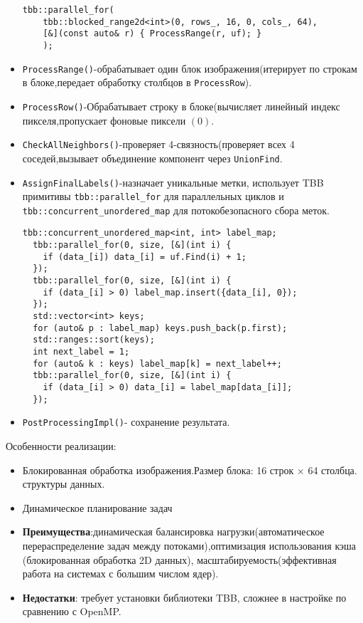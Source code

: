 \documentclass[12pt]{extarticle}
\begin{document}
\begin{itemize}
    \begin{lstlisting}[caption={Разделение изображения на блоки методе ProcessComponents},label={all5}]
    tbb::parallel_for(
    tbb::blocked_range2d<int>(0, rows_, 16, 0, cols_, 64),
    [&](const auto& r) { ProcessRange(r, uf); }
    );
    \end{lstlisting}
    \item \texttt{ProcessRange()}-обрабатывает один блок изображения(итерирует по строкам в блоке,передает обработку столбцов в \texttt{ProcessRow}).
    \item \texttt{ProcessRow()}-Обрабатывает строку в блоке(вычисляет линейный индекс пикселя,пропускает фоновые пиксели $(0)$.
    \item \texttt{CheckAllNeighbors()}-проверяет 4-связность(проверяет всех 4 соседей,вызывает объединение компонент через \texttt{UnionFind}.
   \item \texttt{AssignFinalLabels()}-назначает уникальные метки, использует TBB примитивы  \texttt{tbb::parallel\_for} для параллельных циклов и \texttt{tbb::concurrent\_unordered\_map} для потокобезопасного сбора меток.
     \begin{lstlisting}[caption={Параллельная реализация метода AssignFinalLabels},label={all6}]
    tbb::concurrent_unordered_map<int, int> label_map;
  tbb::parallel_for(0, size, [&](int i) {
    if (data_[i]) data_[i] = uf.Find(i) + 1;
  });
  tbb::parallel_for(0, size, [&](int i) {
    if (data_[i] > 0) label_map.insert({data_[i], 0});
  });
  std::vector<int> keys;
  for (auto& p : label_map) keys.push_back(p.first);
  std::ranges::sort(keys);
  int next_label = 1;
  for (auto& k : keys) label_map[k] = next_label++;
  tbb::parallel_for(0, size, [&](int i) {
    if (data_[i] > 0) data_[i] = label_map[data_[i]];
  });
\end{lstlisting}
\item \texttt{PostProcessingImpl()}- сохранение результата.
\end{itemize}

Особенности реализации:
\begin{itemize}
    \item Блокированная обработка изображения.Размер блока: 16 строк × 64 столбца.
     структуры данных.
    \item Динамическое планирование задач
    \item \textbf{Преимущества}:динамическая балансировка нагрузки(автоматическое перераспределение задач между потоками),оптимизация использования кэша (блокированная обработка 2D данных), масштабируемость(эффективная работа на системах с большим числом ядер).
    \item \textbf{Недостатки}: требует установки библиотеки TBB, сложнее в настройке по сравнению с OpenMP.
\end{itemize}
\end{document}
